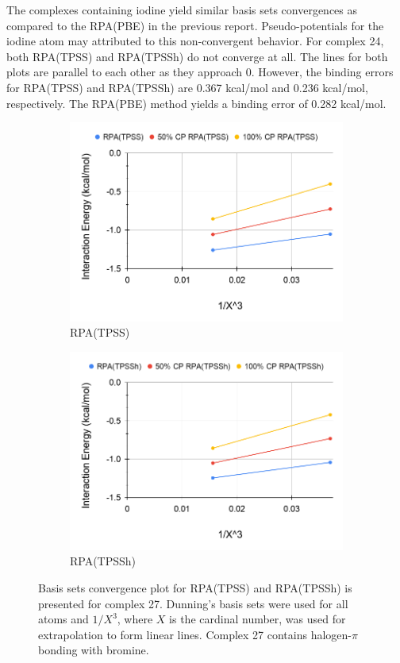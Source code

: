 \documentclass[11pt]{article}
\begin{document}
The complexes containing iodine yield similar basis sets convergences
as compared to the RPA(PBE) in the previous report. Pseudo-potentials
for the iodine atom may attributed to this non-convergent behavior.
For complex 24, both RPA(TPSS) and RPA(TPSSh) do not converge at all.
The lines for both plots are parallel to each other as they approach 0.
However, the binding errors for RPA(TPSS) and RPA(TPSSh) are 0.367 kcal/mol
and 0.236 kcal/mol, respectively. The RPA(PBE) method yields a binding
error of 0.282 kcal/mol. 

\begin{figure}[hbpt]
  \centering
  \begin{subfigure}{.5\textwidth}
    \centering
    \includegraphics[scale=0.3]{tpss-27.png}
    \caption{RPA(TPSS)}
    \label{fig:tpss_27}
  \end{subfigure}%
  \begin{subfigure}{.5\textwidth}
    \centering
    \includegraphics[scale=0.3]{tpssh-27.png}
    \caption{RPA(TPSSh)}
    \label{fig:tpssh_27}
  \end{subfigure}
  \caption{Basis sets convergence plot for RPA(TPSS) and RPA(TPSSh) is
    presented for complex 27. Dunning's basis sets were used for all
    atoms and $1/X^3$, where $X$ is the cardinal number, was used for
    extrapolation to form linear lines. Complex 27 contains halogen-$\pi$
    bonding with bromine.}
  \label{fig:complex_27}
\end{figure}
\end{document}
